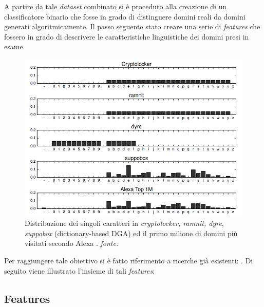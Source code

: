 A partire da tale \textit{dataset} combinato si è proceduto alla creazione di un classificatore binario che fosse in grado di distinguere domini reali da domini generati algoritmicamente. 
Il passo seguente  stato creare una serie di \textit{features} che fossero in grado di descrivere le caratteristiche linguistiche dei domini presi in esame.


\begin{figure}[htb]
    \centering
    \includegraphics[width=0.8\columnwidth]{figures/chardistr.png}
    \caption{Distribuzione dei singoli caratteri in \textit{cryptolocker, ramnit, dyre}, \textit{suppobox} (dictionary-based DGA) ed il primo milione di domini più visitati secondo Alexa \cite{amazon:alexa}.
\textit{fonte:} \cite{deepdga}}
\label{fig:relu}
\end{figure}


Per raggiungere tale obiettivo si è fatto riferimento a ricerche già esistenti: \cite{180232} \cite{Yadav:2010:DAG:1879141.1879148} \cite{Yadav:2012:DAG:2428696.2428722} \cite{Schiavoni2014}. Di seguito viene illustrato l'insieme di tali \textit{features}:

\subsection{Features}
\label{randomforestinterno}

